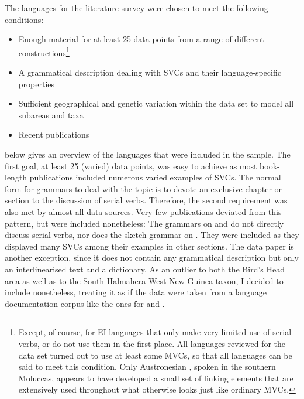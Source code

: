 The languages for the literature survey were chosen to meet the following conditions:
\begin{footnotesize}
\begin{itemize}
\item Enough material for at least 25 data points from a range of different constructions\footnote{Except, of course, for EI languages that only make very limited use of serial verbs, or do not use them in the first place. All languages reviewed for the data set turned out to use at least some MVCs, so that all languages can be said to meet this condition. Only Austronesian , spoken in the southern Moluccas, appears to have developed a small set of linking elements that are extensively used throughout what otherwise looks just like ordinary MVCs.}
\item A grammatical description dealing with SVCs and their language-specific properties
\item Sufficient geographical and genetic variation within the data set to model all subareas and taxa
\largerpage[1]
\item Recent publications
\end{itemize}
\end{footnotesize}

 below gives an overview of the languages that were included in the sample. The first goal, at least 25 (varied) data points, was easy to achieve as most book-length publications included numerous varied examples of SVCs. The normal form for grammars to deal with the topic is to devote an exclusive chapter or section to the discussion of serial verbs. Therefore, the second requirement was also met by almost all data sources. Very few publications deviated from this pattern, but were included nonetheless: The grammars on  \citep{berry1999} and  \citep{huber2011} do not directly discuss serial verbs, nor does the sketch grammar on  \citep{dalrymple2012}. They were included as they displayed many SVCs among their examples in other sections. The  data paper \citep{kamholz2009} is another exception, since it does not contain any grammatical description but only an interlinearised text and a dictionary. As an outlier to both the Bird's Head area as well as to the South Halmahera-West New Guinea taxon, I decided to include  nonetheless, treating it as if the data were taken from a language documentation corpus like the ones for  and .

